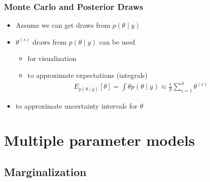 \documentclass[10pt]{beamer}
\begin{document}
\begin{frame}

\end{frame}
\begin{frame}

\frametitle{Monte Carlo and Posterior Draws}

  \begin{itemize}
  \item Assume we can get draws from $p(\theta \mid y)$
  \pause
  \item $\theta^{(s)}$ draws from $p(\theta \mid y)$ can be used
    \begin{itemize}
    \item<1-> for visualization
    \item<2-> to approximate expectations (integrals)
      \begin{align*}
        E_{p(\theta \mid y)}[\theta] = \int \theta p(\theta \mid y) \approx \frac{1}{S}\sum_{s=1}^{S} \theta^{(s)}
      \end{align*}
    \end{itemize}
    \item<3-> to approximate uncertainty intervals for $\theta$
  \end{itemize}

\end{frame}

\section{Multiple parameter models}
\subsection{Marginalization}
\end{document}
